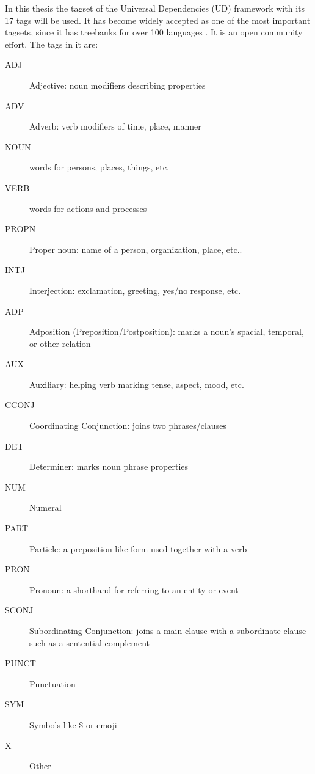 In this thesis the tagset of the Universal Dependencies (UD) framework with its 17 tags will be used. It has become widely accepted as one of the most important tagsets, since it has treebanks for over 100 languages \citep{ud2022opencom}. It is an open community effort. The tags in it are:
\begin{description}
\item[ADJ] Adjective: noun modifiers describing properties
\item[ADV] Adverb: verb modifiers of time, place, manner
\item[NOUN] words for persons, places, things, etc.
\item[VERB] words for actions and processes
\item[PROPN] Proper noun: name of a person, organization, place, etc..
\item[INTJ] Interjection: exclamation, greeting, yes/no response, etc.
\item[ADP] Adposition (Preposition/Postposition): marks a noun’s spacial, temporal, or other relation
\item[AUX] Auxiliary: helping verb marking tense, aspect, mood, etc.
\item[CCONJ] Coordinating Conjunction: joins two phrases/clauses
\item[DET] Determiner: marks noun phrase properties
\item[NUM] Numeral
\item[PART] Particle: a preposition-like form used together with a verb
\item[PRON] Pronoun: a shorthand for referring to an entity or event
\item[SCONJ] Subordinating Conjunction: joins a main clause with a
subordinate clause such as a sentential complement
\item[PUNCT] Punctuation
\item[SYM] Symbols like \$ or emoji
\item[X] Other
\end{description}














